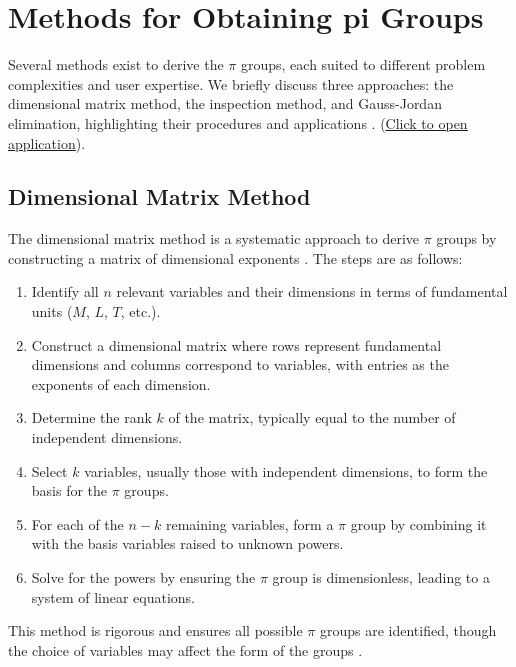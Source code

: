 \documentclass[
	11pt, %
	fleqn, %
	a4paper, %
]{LegrandOrangeBook}
\begin{document}
\section{Methods for Obtaining pi Groups}
\label{sec:methods}

Several methods exist to derive the $\pi$ groups, each suited to different problem complexities and user expertise. We briefly discuss three approaches: the dimensional matrix method, the inspection method, and Gauss-Jordan elimination, highlighting their procedures and applications \cite{Szirtes2007, white2011}.
(\href{http://enriquecastilloron.github.io/PRUEBA/ObtainPiTerms_Flexible_LinearBUENO9a.html}{\underline{Click to open application}}).

\subsection{Dimensional Matrix Method}
\label{subsec:matrix}

The dimensional matrix method is a systematic approach to derive $\pi$ groups by constructing a matrix of dimensional exponents \cite{Szirtes2007}. The steps are as follows:
\begin{enumerate}
    \item Identify all $n$ relevant variables and their dimensions in terms of fundamental units ($M$, $L$, $T$, etc.).
    \item Construct a dimensional matrix where rows represent fundamental dimensions and columns correspond to variables, with entries as the exponents of each dimension.
    \item Determine the rank $k$ of the matrix, typically equal to the number of independent dimensions.
    \item Select $k$ variables, usually those with independent dimensions, to form the basis for the $\pi$ groups.
    \item For each of the $n - k$ remaining variables, form a $\pi$ group by combining it with the basis variables raised to unknown powers.
    \item Solve for the powers by ensuring the $\pi$ group is dimensionless, leading to a system of linear equations.
\end{enumerate}
This method is rigorous and ensures all possible $\pi$ groups are identified, though the choice of variables may affect the form of the groups \cite{Sonin2004}.
\end{document}
